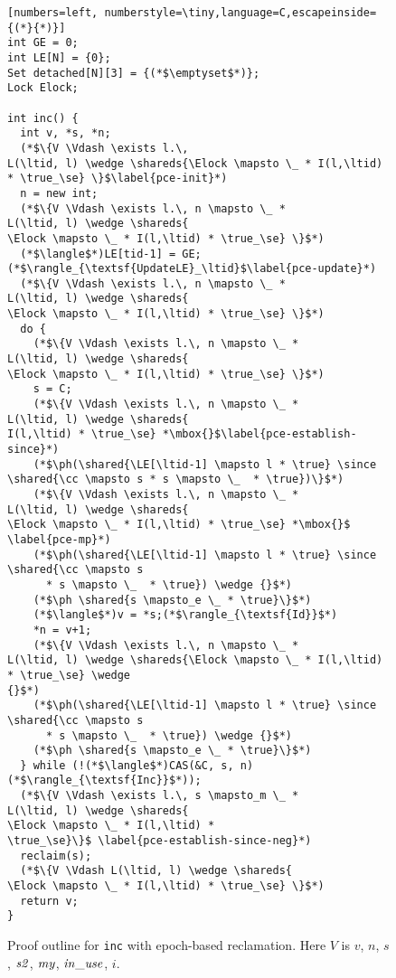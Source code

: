 \begin{figure}
{\figfontsize
\begin{lstlisting}[numbers=left, numberstyle=\tiny,language=C,escapeinside={(*}{*)}]
int GE = 0;
int LE[N] = {0};
Set detached[N][3] = {(*$\emptyset$*)};
Lock Elock;

int inc() {
  int v, *s, *n;
  (*$\{V \Vdash \exists l.\,
L(\ltid, l) \wedge \shareds{\Elock \mapsto \_ * I(l,\ltid) * \true_\se} \}$\label{pce-init}*)
  n = new int;
  (*$\{V \Vdash \exists l.\, n \mapsto \_ *
L(\ltid, l) \wedge \shareds{
\Elock \mapsto \_ * I(l,\ltid) * \true_\se} \}$*)
  (*$\langle$*)LE[tid-1] = GE;(*$\rangle_{\textsf{UpdateLE}_\ltid}$\label{pce-update}*)
  (*$\{V \Vdash \exists l.\, n \mapsto \_ *
L(\ltid, l) \wedge \shareds{
\Elock \mapsto \_ * I(l,\ltid) * \true_\se} \}$*)
  do {
    (*$\{V \Vdash \exists l.\, n \mapsto \_ *
L(\ltid, l) \wedge \shareds{
\Elock \mapsto \_ * I(l,\ltid) * \true_\se} \}$*)
    s = C;
    (*$\{V \Vdash \exists l.\, n \mapsto \_ *
L(\ltid, l) \wedge \shareds{
I(l,\ltid) * \true_\se} *\mbox{}$\label{pce-establish-since}*)
    (*$\ph(\shared{\LE[\ltid-1] \mapsto l * \true} \since 
\shared{\cc \mapsto s * s \mapsto \_  * \true})\}$*)
    (*$\{V \Vdash \exists l.\, n \mapsto \_ *
L(\ltid, l) \wedge \shareds{
\Elock \mapsto \_ * I(l,\ltid) * \true_\se} *\mbox{}$ \label{pce-mp}*)
    (*$\ph(\shared{\LE[\ltid-1] \mapsto l * \true} \since \shared{\cc \mapsto s
      * s \mapsto \_  * \true}) \wedge {}$*)
    (*$\ph \shared{s \mapsto_e \_ * \true}\}$*)
    (*$\langle$*)v = *s;(*$\rangle_{\textsf{Id}}$*)
    *n = v+1;
    (*$\{V \Vdash \exists l.\, n \mapsto \_ *
L(\ltid, l) \wedge \shareds{\Elock \mapsto \_ * I(l,\ltid) * \true_\se} \wedge
{}$*)
    (*$\ph(\shared{\LE[\ltid-1] \mapsto l * \true} \since \shared{\cc \mapsto s
      * s \mapsto \_  * \true}) \wedge {}$*)
    (*$\ph \shared{s \mapsto_e \_ * \true}\}$*)
  } while (!(*$\langle$*)CAS(&C, s, n)(*$\rangle_{\textsf{Inc}}$*));
  (*$\{V \Vdash \exists l.\, s \mapsto_m \_ *
L(\ltid, l) \wedge \shareds{
\Elock \mapsto \_ * I(l,\ltid) * 
\true_\se}\}$ \label{pce-establish-since-neg}*)
  reclaim(s);
  (*$\{V \Vdash L(\ltid, l) \wedge \shareds{
\Elock \mapsto \_ * I(l,\ltid) * \true_\se} \}$*)
  return v;
}
\end{lstlisting}
}
\caption{\small Proof outline for {\tt inc} with epoch-based reclamation.  Here
$V$ is $v$, $n$, $s$, ${\it s2}$, ${\it my}$, ${\it in\_use}$, $i$.}
\label{fig:epoch1}
\end{figure}

